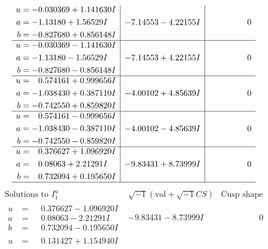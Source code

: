 \documentclass[1p]{elsarticle_modified}
\theoremstyle{definition}
\newcommand{\I}{\sqrt{-1}}
\begin{document}
$$\begin{array}{c|c|c}
\begin{aligned}
u &= -0.030369 + 1.141630 I \\
a &= -1.13180 + 1.56529 I \\
b &= -0.827680 + 0.856148 I\end{aligned}
 & -7.14553 - 4.22155 I & \phantom{-0.000000 } 0 \\ \hline\begin{aligned}
u &= -0.030369 - 1.141630 I \\
a &= -1.13180 - 1.56529 I \\
b &= -0.827680 - 0.856148 I\end{aligned}
 & -7.14553 + 4.22155 I & \phantom{-0.000000 } 0 \\ \hline\begin{aligned}
u &= \phantom{-}0.574161 + 0.999656 I \\
a &= -1.038430 + 0.387110 I \\
b &= -0.742550 + 0.859820 I\end{aligned}
 & -4.00102 + 4.85639 I & \phantom{-0.000000 } 0 \\ \hline\begin{aligned}
u &= \phantom{-}0.574161 - 0.999656 I \\
a &= -1.038430 - 0.387110 I \\
b &= -0.742550 - 0.859820 I\end{aligned}
 & -4.00102 - 4.85639 I & \phantom{-0.000000 } 0 \\ \hline\begin{aligned}
u &= \phantom{-}0.376627 + 1.096920 I \\
a &= \phantom{-}0.08063 + 2.21291 I \\
b &= \phantom{-}0.732094 + 0.195650 I\end{aligned}
 & -9.83431 + 8.73999 I & \phantom{-0.000000 } 0\\
 \hline 
 \end{array}$$\newpage$$\begin{array}{c|c|c}  
\text{Solutions to }I^u_{1}& \I (\text{vol} + \sqrt{-1}CS) & \text{Cusp shape}\\
 \hline 
\begin{aligned}
u &= \phantom{-}0.376627 - 1.096920 I \\
a &= \phantom{-}0.08063 - 2.21291 I \\
b &= \phantom{-}0.732094 - 0.195650 I\end{aligned}
 & -9.83431 - 8.73999 I & \phantom{-0.000000 } 0 \\ \hline\begin{aligned}
u &= \phantom{-}0.131427 + 1.154940 I \\

\end{aligned}
\end{array}$$
\end{document}
